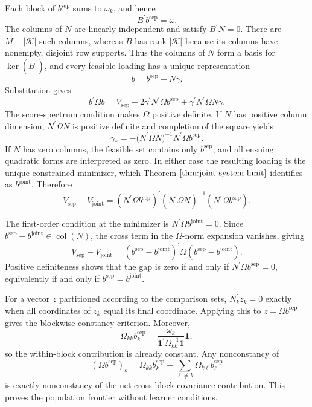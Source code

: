 Each block of \(b^{\mathrm{sep}}\) sums to \(\omega_k\), and hence
\[
 B^{\prime}b^{\mathrm{sep}}=\omega.
\]
The columns of \(N\) are linearly independent and satisfy \(B^{\prime}N=0\). There are \(M-|\mathcal K|\) such columns, whereas \(B\) has rank \(|\mathcal K|\) because its columns have nonempty, disjoint row supports. Thus the columns of \(N\) form a basis for \(\ker(B^{\prime})\), and every feasible loading has a unique representation
\[
 b=b^{\mathrm{sep}}+N\gamma.
\]
Substitution gives
\[
 b^{\prime}\Omega b
 =V_{\mathrm{sep}}+2\gamma^{\prime}N^{\prime}\Omega b^{\mathrm{sep}}
 +\gamma^{\prime}N^{\prime}\Omega N\gamma.
\]
The score-spectrum condition makes \(\Omega\) positive definite. If \(N\) has positive column dimension, \(N^{\prime}\Omega N\) is positive definite and completion of the square yields
\[
 \gamma_*=-\bigl(N^{\prime}\Omega N\bigr)^{-1}
 N^{\prime}\Omega b^{\mathrm{sep}}.
\]
If \(N\) has zero columns, the feasible set contains only \(b^{\mathrm{sep}}\), and all ensuing quadratic forms are interpreted as zero. In either case the resulting loading is the unique constrained minimizer, which Theorem \(\ref{thm:joint-system-limit}\) identifies as \(b^{\mathrm{joint}}\). Therefore
\[
 V_{\mathrm{sep}}-V_{\mathrm{joint}}
 =(N^{\prime}\Omega b^{\mathrm{sep}})^{\prime}
 (N^{\prime}\Omega N)^{-1}
 (N^{\prime}\Omega b^{\mathrm{sep}}).
\]

The first-order condition at the minimizer is \(N^{\prime}\Omega b^{\mathrm{joint}}=0\). Since \(b^{\mathrm{sep}}-b^{\mathrm{joint}}\in\operatorname{col}(N)\), the cross term in the \(\Omega\)-norm expansion vanishes, giving
\[
 V_{\mathrm{sep}}-V_{\mathrm{joint}}
 =(b^{\mathrm{sep}}-b^{\mathrm{joint}})^{\prime}
   \Omega(b^{\mathrm{sep}}-b^{\mathrm{joint}}).
\]
Positive definiteness shows that the gap is zero if and only if \(N^{\prime}\Omega b^{\mathrm{sep}}=0\), equivalently if and only if \(b^{\mathrm{sep}}=b^{\mathrm{joint}}\).

For a vector \(z\) partitioned according to the comparison sets, \(N_k^{\prime}z_k=0\) exactly when all coordinates of \(z_k\) equal its final coordinate. Applying this to \(z=\Omega b^{\mathrm{sep}}\) gives the blockwise-constancy criterion. Moreover,
\[
 \Omega_{kk}b_k^{\mathrm{sep}}
 =\frac{\omega_k}{\mathbf 1^{\prime}\Omega_{kk}^{-1}\mathbf 1}\mathbf 1,
\]
so the within-block contribution is already constant. Any nonconstancy of
\[
 (\Omega b^{\mathrm{sep}})_k
 =\Omega_{kk}b_k^{\mathrm{sep}}
 +\sum_{\ell\ne k}\Omega_{k\ell}b_\ell^{\mathrm{sep}}
\]
is exactly nonconstancy of the net cross-block covariance contribution. This proves the population frontier without learner conditions.


